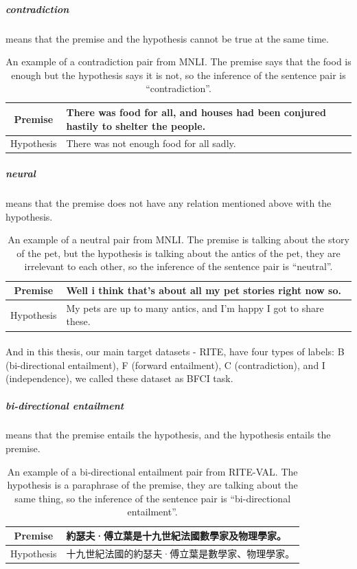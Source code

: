 \documentclass{article}
\begin{document}
\begin{CJK*}{UTF8}{bkai}
\subparagraph{contradiction} means that the premise and the hypothesis cannot be true at the same time.

\begin{table}[ht!]
  \centering
  \begin{tabular}{|c|l|}
    \hline
    Premise & There was food for all, and houses had been conjured hastily to shelter the people. \\ \hline
    Hypothesis & There was not enough food for all sadly. \\ \hline
  \end{tabular}
  \caption[An example of a contradiction pair from MNLI]{An example of a contradiction pair from MNLI. The premise says that the food is enough but the hypothesis says it is not, so the inference of the sentence pair is ``contradiction''.}
\end{table}

\subparagraph{neural} means that the premise does not have any relation mentioned above with the hypothesis.

\begin{table}[ht!]
  \centering
  \begin{tabular}{|c|l|}
    \hline
    Premise & Well i think that's about all my pet stories right now so. \\ \hline
    Hypothesis & My pets are up to many antics, and I'm happy I got to share these. \\ \hline
  \end{tabular}
  \caption[An example of a neutral pair from MNLI]{An example of a neutral pair from MNLI. The premise is talking about the story of the pet, but the hypothesis is talking about the antics of the pet, they are irrelevant to each other, so the inference of the sentence pair is ``neutral''.}
\end{table}

\paragraph{}
And in this thesis, our main target datasets - RITE, have four types of labels: B (bi-directional entailment), F (forward entailment), C (contradiction), and I (independence), we called these dataset as BFCI task.

\subparagraph{bi-directional entailment} means that the premise entails the hypothesis, and the hypothesis entails the premise.

\begin{table}[ht!]
  \centering
  \begin{tabular}{|c|l|}
    \hline
    Premise & 約瑟夫·傅立葉是十九世紀法國數學家及物理學家。 \\ \hline
    Hypothesis & 十九世紀法國的約瑟夫·傅立葉是數學家、物理學家。 \\ \hline
  \end{tabular}
  \caption[An example of a bi-directional entailment pair from RITE-VAL]{An example of a bi-directional entailment pair from RITE-VAL. The hypothesis is a paraphrase of the premise, they are talking about the same thing, so the inference of the sentence pair is ``bi-directional entailment''.}
\end{table}


\end{CJK*}
\end{document}
